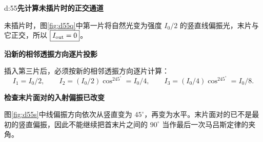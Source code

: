 \begin{drillsolution}{d:55}\textbf{先计算未插片时的正交通道}\par\nobreak
未插片时，图\ref{fig:d55q}中第一片将自然光变为强度 \(I_0/2\) 的竖直线偏振光，末片与它正交，所以 \(\boxed{I_{\rm out}=0}\)。



\par\medskip{}\noindent\textbf{沿新的相邻透振方向逐片投影}\par\nobreak
插入第三片后，必须按新的相邻透振方向逐片计算：
\[
 I_1=I_0/2,\qquad
 I_2=(I_0/2)\cos^245^\circ=I_0/4,\qquad
 \boxed{I_3=(I_0/4)\cos^245^\circ=I_0/8}.
\]


\par\medskip{}\noindent\textbf{检查末片面对的入射偏振已改变}\par\nobreak
图\ref{fig:d55s}中线偏振方向依次从竖直变为 \(45^\circ\)，再变为水平。末片面对的已不是最初的竖直偏振，因此不能继续把首末片之间的 \(90^\circ\) 当作最后一次马吕斯定律的夹角。

\end{drillsolution}

